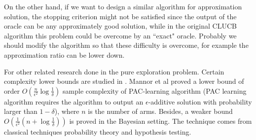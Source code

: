 \documentclass[bachelor]{thuthesis}
\begin{document}
\begin{appendix}
On the other hand, if we want to design a similar algorithm for approximation solution, the stopping criterion might not be satisfied since the output of the oracle can be any approximately good solution, while in the original CLUCB algorithm this problem could be overcome by an ``exact" oracle. Probably we should modify the algorithm so that these difficulty is overcome, for example the approximation ratio can be lower down.

For other related research done in the pure exploration problem. Certain complexity lower bounds are studied in \cite{lower}. Mannor et al proved a lower bound of order $O(\frac{n}{\epsilon^2}\log\frac{1}{\delta})$ sample complexity of PAC-learning algorithm (PAC learning algorithm requires the algorithm to output an $\epsilon$-additive solution with probability larger than $1-\delta$), where $n$ is the number of arms. Besides, a weaker bound $O(\frac{1}{\epsilon^2}(n+\log\frac{1}{\delta}))$ is proved in the Bayesian setting. The technique comes from classical techniques probability theory and hypothesis testing.


\end{appendix}


%
\end{document}
